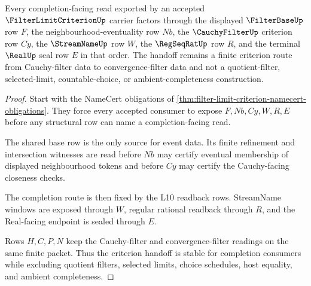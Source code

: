 \begin{theorem}\label{thm:filter-limit-criterion-cauchy-filter-handoff}
Every completion-facing read exported by an accepted $\FilterLimitCriterionUp$ carrier factors through the displayed $\FilterBaseUp$ row $F$, the neighbourhood-eventuality row $Nb$, the $\CauchyFilterUp$ criterion row $Cy$, the $\StreamNameUp$ row $W$, the $\RegSeqRatUp$ row $R$, and the terminal $\RealUp$ seal row $E$ in that order. The handoff remains a finite criterion route from Cauchy-filter data to convergence-filter data and not a quotient-filter, selected-limit, countable-choice, or ambient-completeness construction.
\end{theorem}
\begin{proof}
Start with the NameCert obligations of \autoref{thm:filter-limit-criterion-namecert-obligations}. They force every accepted consumer to expose $F,Nb,Cy,W,R,E$ before any structural row can name a completion-facing read.

The shared base row is the only source for event data. Its finite refinement and intersection witnesses are read before $Nb$ may certify eventual membership of displayed neighbourhood tokens and before $Cy$ may certify the Cauchy-facing closeness checks.

The completion route is then fixed by the L10 readback rows. StreamName windows are exposed through $W$, regular rational readback through $R$, and the Real-facing endpoint is sealed through $E$.

Rows $H,C,P,N$ keep the Cauchy-filter and convergence-filter readings on the same finite packet. Thus the criterion handoff is stable for completion consumers while excluding quotient filters, selected limits, choice schedules, host equality, and ambient completeness.
\end{proof}



